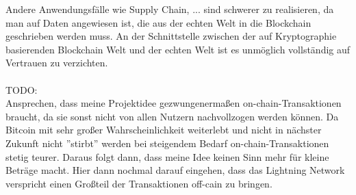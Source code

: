 Andere Anwendungsfälle wie Supply Chain, ... sind schwerer zu realisieren, da man auf Daten angewiesen ist, die aus der echten Welt in die Blockchain geschrieben werden muss. An der Schnittstelle zwischen der auf Kryptographie basierenden Blockchain Welt und der echten Welt ist es unmöglich vollständig auf Vertrauen zu verzichten.\\\\

TODO:\\
Ansprechen, dass meine Projektidee gezwungenermaßen on-chain-Transaktionen braucht, da sie sonst nicht von allen Nutzern nachvollzogen werden können. Da Bitcoin mit sehr großer Wahrscheinlichkeit weiterlebt und nicht in nächster Zukunft nicht ''stirbt'' werden bei steigendem Bedarf on-chain-Transaktionen stetig teurer. Daraus folgt dann, dass meine Idee keinen Sinn mehr für kleine Beträge macht. Hier dann nochmal darauf eingehen, dass das Lightning Network verspricht einen Großteil der Transaktionen off-cain zu bringen.